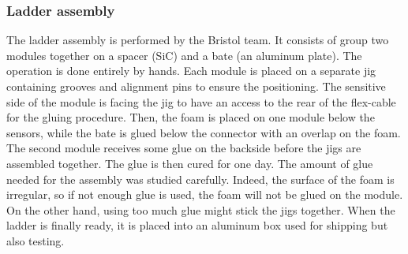 

    \subsubsection{Ladder assembly}

    The ladder assembly is performed by the Bristol team.
    It consists of group two modules together on a spacer (\gls{SiC}) and a bate (an aluminum plate).
    The operation is done entirely by hands.
    Each module is placed on a separate jig containing grooves and alignment pins to ensure the positioning.
    The sensitive side of the module is facing the jig to have an access to the rear of the flex-cable for the gluing procedure.
    Then, the foam is placed on one module below the sensors, while the bate is glued below the connector with an overlap on the foam.
    The second module receives some glue on the backside before the jigs are assembled together.
    The glue is then cured for one day.
    The amount of glue needed for the assembly was studied carefully. 
    Indeed, the surface of the foam is irregular, so if not enough glue is used, the foam will not be glued on the module.
    On the other hand, using too much glue might stick the jigs together.
    When the ladder is finally ready, it is placed into an aluminum box used for shipping but also testing.
   
